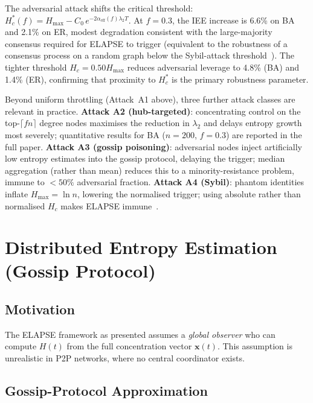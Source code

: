 \documentclass[review,12pt]{elsarticle}
\newcommand{\bfx}{\mathbf{x}}
\newcommand{\Hc}{H_c}
\newcommand{\Hmax}{H_{\max}}
\begin{document}
The adversarial attack shifts the critical threshold:
$\Hc^*(f) = \Hmax - C_0\,e^{-2\alpha_{\mathrm{eff}}(f)\lambda_2 T}$.
At $f=0.3$, the IEE increase is 6.6\% on BA and 2.1\% on ER, modest
degradation consistent with the large-majority consensus required for ELAPSE
to trigger (equivalent to the robustness of a consensus process on a random
graph below the Sybil-attack threshold~\cite{douceur2002sybil}).
The tighter threshold $\Hc = 0.50\Hmax$ reduces adversarial leverage
to 4.8\% (BA) and 1.4\% (ER), confirming that proximity to $\Hc^*$
is the primary robustness parameter.

Beyond uniform throttling (Attack~A1 above), three further attack classes
are relevant in practice.
\textbf{Attack A2 (hub-targeted)}: concentrating control on the top-$\lceil fn\rceil$
degree nodes maximises the reduction in $\lambda_2$ and delays entropy growth most
severely; quantitative results for BA ($n=200$, $f=0.3$) are reported
in the full paper.
\textbf{Attack A3 (gossip poisoning)}: adversarial nodes inject artificially low
entropy estimates into the gossip protocol, delaying the trigger;
median aggregation (rather than mean) reduces this to a minority-resistance
problem, immune to $< 50\%$ adversarial fraction.
\textbf{Attack A4 (Sybil)}: phantom identities inflate $\Hmax = \ln n$,
lowering the normalised trigger; using absolute rather than normalised $\Hc$
makes ELAPSE immune~\cite{douceur2002sybil}.

\appendix

\section{Distributed Entropy Estimation (Gossip Protocol)}
\label{sec:gossip}

\subsection{Motivation}

The ELAPSE framework as presented assumes a \emph{global observer} who can
compute $H(t)$ from the full concentration vector $\bfx(t)$. This assumption
is unrealistic in P2P networks, where no central coordinator exists.

\subsection{Gossip-Protocol Approximation}
\end{document}
